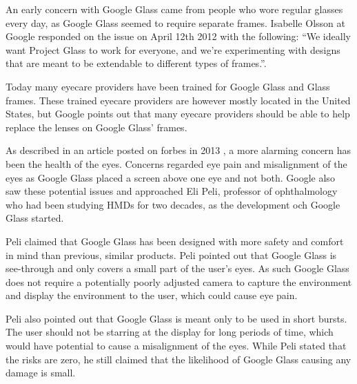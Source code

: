 An early concern with Google Glass came from people who wore regular glasses every day, as Google Glass seemed to require separate frames. Isabelle Olsson at Google responded on the issue on April 12th 2012 with the following: ``We ideally want Project Glass to work for everyone, and we're experimenting with designs that are meant to be extendable to different types of frames.''.\cite{GoogleGlassFrameResponse}

Today many eyecare providers have been trained for Google Glass and Glass frames. These trained eyecare providers are however mostly located in the United States,\cite{frameProviders} but Google points out that many eyecare providers should be able to help replace the lenses on Google Glass' frames\cite{framesGlass}.

As described in an article posted on forbes in 2013\cite{ackerman13} , a more alarming concern has been the health of the eyes. Concerns regarded eye pain and misalignment of the eyes as Google Glass placed a screen above one eye and not both. Google also saw these potential issues and approached Eli Peli, professor of ophthalmology who had been studying HMDs for two decades, as the development och Google Glass started.

Peli claimed that Google Glass has been designed with more safety and comfort in mind than previous, similar products. Peli pointed out that Google Glass is see-through and only covers a small part of the user's eyes. As such Google Glass does not require a potentially poorly adjusted camera to capture the environment and display the environment to the user, which could cause eye pain.

Peli also pointed out that Google Glass is meant only to be used in short bursts. The user should not be starring at the display for long periods of time, which would have potential to cause a misalignment of the eyes. While Peli stated that the risks are zero, he still claimed that the likelihood of Google Glass causing any damage is small.

